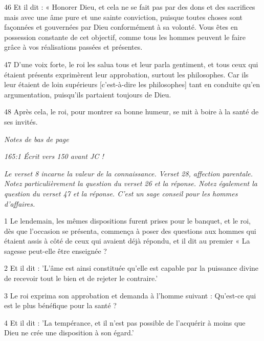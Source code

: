 \par 46 Et il dit : « Honorer Dieu, et cela ne se fait pas par des dons et des sacrifices mais avec une âme pure et une sainte conviction, puisque toutes choses sont façonnées et gouvernées par Dieu conformément à sa volonté. Vous êtes en possession constante de cet objectif, comme tous les hommes peuvent le faire grâce à vos réalisations passées et présentes.

\par 47 D'une voix forte, le roi les salua tous et leur parla gentiment, et tous ceux qui étaient présents exprimèrent leur approbation, surtout les philosophes. Car ils leur étaient de loin supérieurs [c'est-à-dire les philosophes] tant en conduite qu'en argumentation, puisqu'ils partaient toujours de Dieu.

\par 48 Après cela, le roi, pour montrer sa bonne humeur, se mit à boire à la santé de ses invités.

\par \textit{Notes de bas de page}

\par \textit{165:1 Écrit vers 150 avant JC !}


\par \textit{Le verset 8 incarne la valeur de la connaissance. Verset 28, affection parentale. Notez particulièrement la question du verset 26 et la réponse. Notez également la question du verset 47 et la réponse. C'est un sage conseil pour les hommes d'affaires.}

\par 1 Le lendemain, les mêmes dispositions furent prises pour le banquet, et le roi, dès que l'occasion se présenta, commença à poser des questions aux hommes qui étaient assis à côté de ceux qui avaient déjà répondu, et il dit au premier « La sagesse peut-elle être enseignée ?

\par 2 Et il dit : 'L'âme est ainsi constituée qu'elle est capable par la puissance divine de recevoir tout le bien et de rejeter le contraire.'

\par 3 Le roi exprima son approbation et demanda à l'homme suivant : Qu'est-ce qui est le plus bénéfique pour la santé ?

\par 4 Et il dit : 'La tempérance, et il n'est pas possible de l'acquérir à moins que Dieu ne crée une disposition à son égard.'


